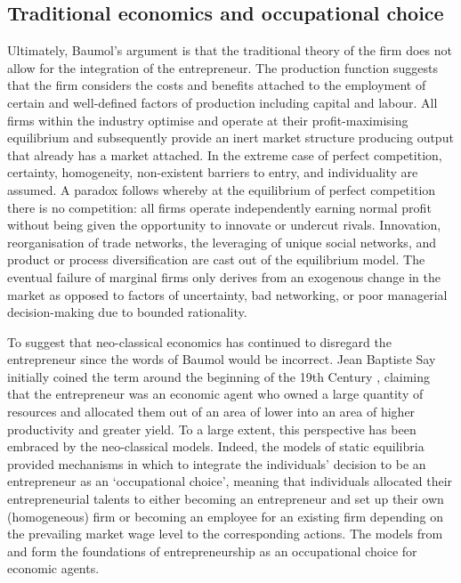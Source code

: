 \subsection{Traditional economics and occupational choice}

Ultimately, Baumol's argument is that the traditional theory of the firm does not allow for the integration of the entrepreneur. The production function suggests that the firm considers the costs and benefits attached to the employment of certain and well-defined factors of production including capital and labour. All firms within the industry optimise and operate at their profit-maximising equilibrium and subsequently provide an inert market structure producing output that already has a market attached. In the extreme case of perfect competition, certainty, homogeneity, non-existent barriers to entry, and individuality are assumed. A paradox follows whereby at the equilibrium of perfect competition there is no competition: all firms operate independently earning normal profit without being given the opportunity to innovate or undercut rivals. Innovation, reorganisation of trade networks, the leveraging of unique social networks, and product or process diversification are cast out of the equilibrium model. The eventual failure of marginal firms only derives from an exogenous change in the market as opposed to factors of uncertainty, bad networking, or poor managerial decision-making due to bounded rationality.

To suggest that neo-classical economics has continued to disregard the entrepreneur since the words of Baumol would be incorrect. Jean Baptiste Say initially coined the term around the beginning of the 19th Century \citep{Hindle2008}, claiming that the entrepreneur was an economic agent who owned a large quantity of resources and allocated them out of an area of lower into an area of higher productivity and greater yield. To a large extent, this perspective has been embraced by the neo-classical models. Indeed, the models of static equilibria provided mechanisms in which to integrate the individuals' decision to be an entrepreneur as an `occupational choice', meaning that individuals allocated their entrepreneurial talents to either becoming an entrepreneur and set up their own (homogeneous) firm or becoming an employee for an existing firm depending on the prevailing market wage level to the corresponding actions. The models from \citet{Lucas1978} and \citet{KihlstromLaffont1979} form the foundations of entrepreneurship as an occupational choice for economic agents.

